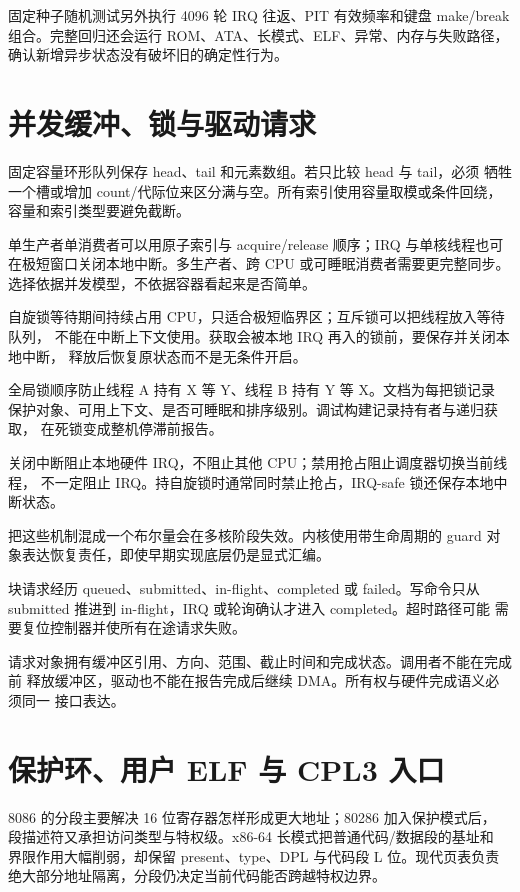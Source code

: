 固定种子随机测试另外执行 4096 轮 IRQ 往返、PIT 有效频率和键盘 make/break
组合。完整回归还会运行 ROM、ATA、长模式、ELF、异常、内存与失败路径，
确认新增异步状态没有破坏旧的确定性行为。

\section{并发缓冲、锁与驱动请求}

固定容量环形队列保存 head、tail 和元素数组。若只比较 head 与 tail，必须
牺牲一个槽或增加 count/代际位来区分满与空。所有索引使用容量取模或条件回绕，
容量和索引类型要避免截断。

单生产者单消费者可以用原子索引与 acquire/release 顺序；IRQ 与单核线程也可
在极短窗口关闭本地中断。多生产者、跨 CPU 或可睡眠消费者需要更完整同步。
选择依据并发模型，不依据容器看起来是否简单。

自旋锁等待期间持续占用 CPU，只适合极短临界区；互斥锁可以把线程放入等待队列，
不能在中断上下文使用。获取会被本地 IRQ 再入的锁前，要保存并关闭本地中断，
释放后恢复原状态而不是无条件开启。

全局锁顺序防止线程 A 持有 X 等 Y、线程 B 持有 Y 等 X。文档为每把锁记录
保护对象、可用上下文、是否可睡眠和排序级别。调试构建记录持有者与递归获取，
在死锁变成整机停滞前报告。

关闭中断阻止本地硬件 IRQ，不阻止其他 CPU；禁用抢占阻止调度器切换当前线程，
不一定阻止 IRQ。持自旋锁时通常同时禁止抢占，IRQ-safe 锁还保存本地中断状态。

把这些机制混成一个布尔量会在多核阶段失效。内核使用带生命周期的 guard
对象表达恢复责任，即使早期实现底层仍是显式汇编。

块请求经历 queued、submitted、in-flight、completed 或 failed。写命令只从
submitted 推进到 in-flight，IRQ 或轮询确认才进入 completed。超时路径可能
需要复位控制器并使所有在途请求失败。

请求对象拥有缓冲区引用、方向、范围、截止时间和完成状态。调用者不能在完成前
释放缓冲区，驱动也不能在报告完成后继续 DMA。所有权与硬件完成语义必须同一
接口表达。

\section{保护环、用户 ELF 与 CPL3 入口}

8086 的分段主要解决 16 位寄存器怎样形成更大地址；80286 加入保护模式后，
段描述符又承担访问类型与特权级。x86-64 长模式把普通代码/数据段的基址和
界限作用大幅削弱，却保留 present、type、DPL 与代码段 L 位。现代页表负责
绝大部分地址隔离，分段仍决定当前代码能否跨越特权边界。

